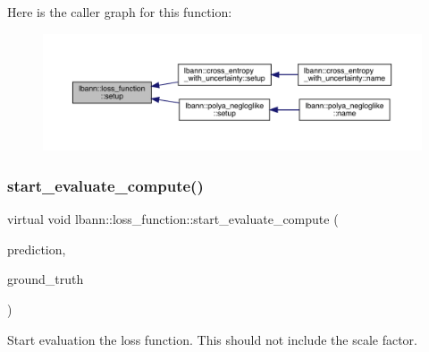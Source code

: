 Here is the caller graph for this function\+:\nopagebreak
\begin{figure}[H]
\begin{center}
\leavevmode
\includegraphics[width=350pt]{classlbann_1_1loss__function_a17a3629e8519c4215ad776a0c7b522ae_icgraph}
\end{center}
\end{figure}
\mbox{\label{classlbann_1_1loss__function_a0bbe41060d788dc7a29f3737761a6f7d}} 
\subsubsection{\texorpdfstring{start\+\_\+evaluate\+\_\+compute()}{start\_evaluate\_compute()}}
{\footnotesize\ttfamily virtual void lbann\+::loss\+\_\+function\+::start\+\_\+evaluate\+\_\+compute (\begin{DoxyParamCaption}\item[{const \hyperlink{base_8hpp_a9a697a504ae84010e7439ffec862b470}{Abs\+Dist\+Mat} \&}]{prediction,  }\item[{const \hyperlink{base_8hpp_a9a697a504ae84010e7439ffec862b470}{Abs\+Dist\+Mat} \&}]{ground\+\_\+truth }\end{DoxyParamCaption})\hspace{0.3cm}{\ttfamily [pure virtual]}}

Start evaluation the loss function. This should not include the scale factor. 

